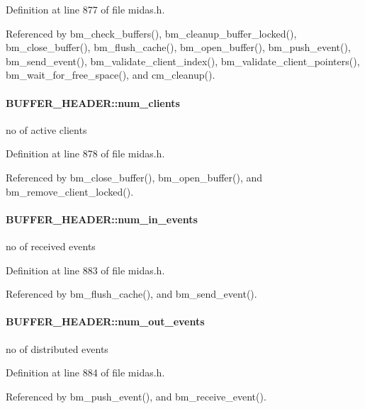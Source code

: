Definition at line 877 of file midas.h.

Referenced by bm\_\-check\_\-buffers(), bm\_\-cleanup\_\-buffer\_\-locked(), bm\_\-close\_\-buffer(), bm\_\-flush\_\-cache(), bm\_\-open\_\-buffer(), bm\_\-push\_\-event(), bm\_\-send\_\-event(), bm\_\-validate\_\-client\_\-index(), bm\_\-validate\_\-client\_\-pointers(), bm\_\-wait\_\-for\_\-free\_\-space(), and cm\_\-cleanup().
\paragraph[{num\_\-clients}]{ {\bf BUFFER\_\-HEADER::num\_\-clients}}\hfill\label{structBUFFER__HEADER_a3c6af0363e3034c956a264fe6a25ddfb}
no of active clients 

Definition at line 878 of file midas.h.

Referenced by bm\_\-close\_\-buffer(), bm\_\-open\_\-buffer(), and bm\_\-remove\_\-client\_\-locked().
\paragraph[{num\_\-in\_\-events}]{ {\bf BUFFER\_\-HEADER::num\_\-in\_\-events}}\hfill\label{structBUFFER__HEADER_a1cb3b9436d59dba0946de51581e68fbd}
no of received events 

Definition at line 883 of file midas.h.

Referenced by bm\_\-flush\_\-cache(), and bm\_\-send\_\-event().
\paragraph[{num\_\-out\_\-events}]{ {\bf BUFFER\_\-HEADER::num\_\-out\_\-events}}\hfill\label{structBUFFER__HEADER_a945ea5f8272cf66bfe20e68a0b86b599}
no of distributed events 

Definition at line 884 of file midas.h.

Referenced by bm\_\-push\_\-event(), and bm\_\-receive\_\-event().
